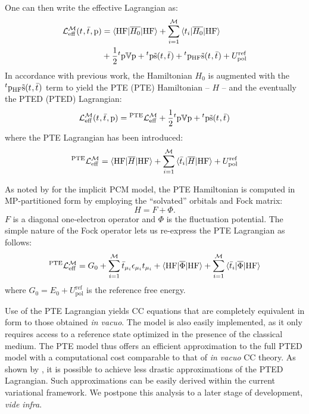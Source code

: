 One can then write the effective Lagrangian as:
\begin{equation}
  \begin{aligned}
  \mathcal{L}^\mathcal{M}_\mathrm{eff}(t_{}, \bar{t}_{}, \mathrm{p}) &=
  \braket{\mathrm{HF} | \overline{H_0} | \mathrm{HF}}
  + \sum_{i=1}^{\mathcal{M}}\braket{t_{i} | \overline{H_0} | \mathrm{HF}} \\
  &+
  \frac{1}{2}{}^t\mathrm{p}\mathbb{V}\mathrm{p} + {}^t\mathrm{p}\tilde{\mathrm{s}}(t_{},\bar{t}_{})
  + {}^t\mathrm{p}_\mathrm{HF}\tilde{\mathrm{s}}(t_{},\bar{t}_{})
  + U_\mathrm{pol}^\mathrm{ref}
  \end{aligned}
\end{equation}
In accordance with previous work,\autocite{Cammi2009-gu, Caricato2011-tx} the
Hamiltonian $H_0$ is augmented with the
${}^t\mathrm{p}_\mathrm{HF}\tilde{\mathrm{s}}(t_{},\bar{t}_{})$ term
to yield the \acl{PTE} (\acs{PTE}) Hamiltonian -- $H$ -- and the
eventually the \acl{PTED} (\acs{PTED}) Lagrangian:
\begin{equation}\label{eq:pted-cc}
  \mathcal{L}^\mathcal{M}_\mathrm{eff}(t_{}, \bar{t}_{}, \mathrm{p}) =
  {}^\mathrm{PTE}\mathcal{L}^\mathcal{M}_\mathrm{eff}
  + \frac{1}{2}{}^t\mathrm{p}\mathbb{V}\mathrm{p} + {}^t\mathrm{p}\tilde{\mathrm{s}}(t_{},\bar{t}_{})
\end{equation}
where the \acs{PTE} Lagrangian has been introduced:
\begin{equation}
{}^\mathrm{PTE}\mathcal{L}^\mathcal{M}_\mathrm{eff}
  =
  \braket{\mathrm{HF} | \overline{H} | \mathrm{HF}}
  + \sum_{i=1}^{\mathcal{M}}\braket{\bar{t}_{i} | \overline{H} | \mathrm{HF}}
  + U_\mathrm{pol}^\mathrm{ref}
\end{equation}

As noted by \citeauthor{Cammi2009-gu} for the implicit \acs{PCM} model,
the \acs{PTE} Hamiltonian is computed in \acs{MP}-partitioned form by
employing the ``solvated'' orbitals and Fock matrix:
\begin{equation}
  H = F + \Phi.
\end{equation}
$F$ is a diagonal one-electron operator and $\Phi$ is the
fluctuation potential.
The simple nature of the Fock operator lets us re-express the \acs{PTE}
Lagrangian as follows:
\begin{equation}
{}^\mathrm{PTE}\mathcal{L}^\mathcal{M}_\mathrm{eff}
  =
  G_0
  + \sum_{i=1}^{\mathcal{M}}\bar{t}_{\mu_i}\epsilon_{\mu_i}t_{\mu_i}
  + \braket{\mathrm{HF} | \overline{\Phi} | \mathrm{HF}}
  + \sum_{i=1}^{\mathcal{M}}\braket{\bar{t}_{i} | \overline{\Phi} | \mathrm{HF}}
\end{equation}
where $G_0 = E_0 + U_\mathrm{pol}^\mathrm{ref}$ is the reference free
energy.

Use of the \acs{PTE} Lagrangian yields \acs{CC} equations that are
completely equivalent in form to those obtained \emph{in vacuo}.
The model is also easily implemented, as it only requires access to a
reference state optimized in the presence of the classical medium.
The \acs{PTE} model thus offers an efficient approximation to the full
\acs{PTED} model with a computational cost comparable to that of
\emph{in vacuo} \acs{CC} theory.
As shown by \citeauthor{Caricato2011-tx}, it is possible to achieve less
drastic approximations of the \acs{PTED} Lagrangian. Such approximations
can be easily derived within the current variational framework. We
postpone this analysis to a later stage of development, \emph{vide
infra}.

